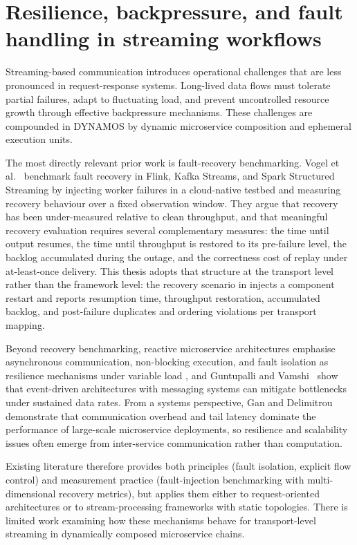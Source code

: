 \section{Resilience, backpressure, and fault handling in streaming workflows}

Streaming-based communication introduces operational challenges that are less pronounced in request-response systems. Long-lived data flows must tolerate partial failures, adapt to fluctuating load, and prevent uncontrolled resource growth through effective backpressure mechanisms. These challenges are compounded in DYNAMOS by dynamic microservice composition and ephemeral execution units.

The most directly relevant prior work is fault-recovery benchmarking. Vogel et al.~\cite{vogel2024faultRecovery} benchmark fault recovery in Flink, Kafka Streams, and Spark Structured Streaming by injecting worker failures in a cloud-native testbed and measuring recovery behaviour over a fixed observation window. They argue that recovery has been under-measured relative to clean throughput, and that meaningful recovery evaluation requires several complementary measures: the time until output resumes, the time until throughput is restored to its pre-failure level, the backlog accumulated during the outage, and the correctness cost of replay under at-least-once delivery. This thesis adopts that structure at the transport level rather than the framework level: the recovery scenario in  injects a component restart and reports resumption time, throughput restoration, accumulated backlog, and post-failure duplicates and ordering violations per transport mapping.

Beyond recovery benchmarking, reactive microservice architectures emphasise asynchronous communication, non-blocking execution, and fault isolation as resilience mechanisms under variable load \cite{rasheedh2021reactive}, and Guntupalli and Vamshi~\cite{guntupalli2023highvolume} show that event-driven architectures with messaging systems can mitigate bottlenecks under sustained data rates. From a systems perspective, Gan and Delimitrou~\cite{gan2018architectural} demonstrate that communication overhead and tail latency dominate the performance of large-scale microservice deployments, so resilience and scalability issues often emerge from inter-service communication rather than computation.

Existing literature therefore provides both principles (fault isolation, explicit flow control) and measurement practice (fault-injection benchmarking with multi-dimensional recovery metrics), but applies them either to request-oriented architectures or to stream-processing frameworks with static topologies. There is limited work examining how these mechanisms behave for transport-level streaming in dynamically composed microservice chains.

